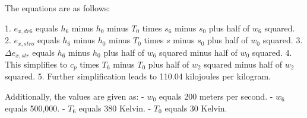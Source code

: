 The equations are as follows:

1. \( e_{x,dr6} \) equals \( h_6 \) minus \( h_0 \) minus \( T_0 \) times \( s_6 \) minus \( s_0 \) plus half of \( w_6 \) squared.
2. \( e_{x,stro} \) equals \( h_6 \) minus \( h_0 \) minus \( T_0 \) times \( s \) minus \( s_0 \) plus half of \( w_0 \) squared.
3. \( \Delta e_{x,str} \) equals \( h_6 \) minus \( h_0 \) plus half of \( w_6 \) squared minus half of \( w_0 \) squared.
4. This simplifies to \( c_p \) times \( T_6 \) minus \( T_0 \) plus half of \( w_2 \) squared minus half of \( w_2 \) squared.
5. Further simplification leads to 110.04 kilojoules per kilogram.

Additionally, the values are given as:
- \( w_0 \) equals 200 meters per second.
- \( w_6 \) equals 500,000.
- \( T_6 \) equals 380 Kelvin.
- \( T_0 \) equals 30 Kelvin.